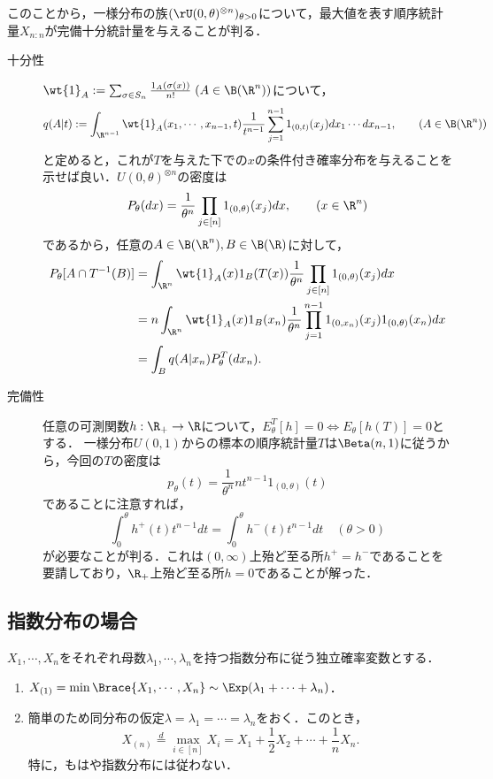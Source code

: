 \documentclass[uplatex,dvipdfmx]{jsreport}
\begin{document}
\begin{example}[一様分布族の完備十分統計量]
    このことから，一様分布の族$(\rU(0,\theta)^{\otimes n})_{\theta>0}$について，最大値を表す順序統計量$X_{n:n}$が完備十分統計量を与えることが判る．
\end{example}
\begin{Proof}\mbox{}
    \begin{description}
        \item[十分性] $\wt{1}_A:=\sum_{\sigma\in S_n}\frac{1_A(\sigma(x))}{n!}\;(A\in\B(\R^n))$について，
        \[q(A|t):=\int_{\R^{n-1}}\wt{1}_A(x_1,\cdots,x_{n-1},t)\frac{1}{t^{n-1}}\sum_{j=1}^{n-1}1_{(0,t)}(x_j)dx_1\cdots dx_{n-1},\qquad(A\in\B(\R^n))\]
        と定めると，これが$T$を与えた下での$x$の条件付き確率分布を与えることを示せば良い．$U(0,\theta)^{\otimes n}$の密度は
        \[P_\theta(dx)=\frac{1}{\theta^n}\prod_{j\in[n]}1_{(0,\theta)}(x_j)dx,\qquad(x\in\R^n)\]
        であるから，任意の$A\in\B(\R^n),B\in\B(\R)$に対して，
        \begin{align*}
            P_\theta[A\cap T^{-1}(B)]&=\int_{\R^n}\wt{1}_A(x)1_B(T(x))\frac{1}{\theta^n}\prod_{j\in[n]}1_{(0,\theta)}(x_j)dx\\
            &=n\int_{\R^n}\wt{1}_A(x)1_B(x_n)\frac{1}{\theta^n}\prod_{j=1}^{n-1}1_{(0,x_n)}(x_j)1_{(0,\theta)}(x_n)dx\\
            &=\int_Bq(A|x_n)P^T_\theta(dx_n).
        \end{align*}
        \item[完備性] 任意の可測関数$h:\R_+\to\R$について，$E^T_\theta[h]=0\Leftrightarrow E_\theta[h(T)]=0$とする．
        一様分布$U(0,1)$からの標本の順序統計量$T$は$\Beta(n,1)$に従うから，今回の$T$の密度は
        \[p_\theta(t)=\frac{1}{\theta^n}nt^{n-1}1_{(0,\theta)}(t)\]
        であることに注意すれば，
        \[\int^\theta_0h^+(t)t^{n-1}dt=\int^\theta_0h^-(t)t^{n-1}dt\quad(\theta>0)\]
        が必要なことが判る．これは$(0,\infty)$上殆ど至る所$h^+=h^-$であることを要請しており，$\R_+$上殆ど至る所$h=0$であることが解った．
    \end{description}
\end{Proof}

\subsection{指数分布の場合}

\begin{proposition}
    $X_1,\cdots,X_n$をそれぞれ母数$\lambda_1,\cdots,\lambda_n$を持つ指数分布に従う独立確率変数とする．
    \begin{enumerate}
        \item $X_{(1)}=\min\Brace{X_1,\cdots,X_n}\sim\Exp(\lambda_1+\cdots+\lambda_n)$．
        \item 簡単のため同分布の仮定$\lambda=\lambda_1=\cdots=\lambda_n$をおく．このとき，
        \[X_{(n)}\overset{d}{=}\max_{i\in[n]}X_i=X_1+\frac{1}{2}X_2+\cdots+\frac{1}{n}X_n.\]
        特に，もはや指数分布には従わない．
    \end{enumerate}
\end{proposition}
\end{document}
